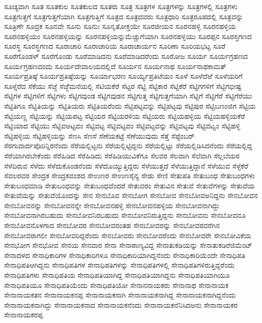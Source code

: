 {ಸೂಚ್ಯವಾಗಿ
ಸೂತ
ಸೂತಕುಲ
ಸೂತಕುಲದ
ಸೂತರು
ಸೂತ್ರ
ಸೂತ್ರಗಳ
ಸೂತ್ರಗಳನ್ನು
ಸೂತ್ರಗಳಲ್ಲಿ
ಸೂತ್ರಗಳು
ಸೂತ್ರಗುತ್ತಗೆ
ಸೂತ್ರಗುತ್ತಗೆಯಾಗಿ
ಸೂತ್ರಗುತ್ತಿಗೆ
ಸೂತ್ರದ
ಸೂತ್ರದವರು
ಸೂತ್ರಧಾರಿ
ಸೂತ್ರರೂಪದಲ್ಲಿ
ಸೂತ್ರವನ್ನು
ಸೂತ್ರಿಣೇ
ಸೂದ್ರಕ
ಸೂನವೇ
ಸೂನು
ಸೂನುಃ
ಸೂನೃತೋಕ್ತಯೇ
ಸೂರಜೀಯನ
ಸೂರನಹಳ್ಳಿ
ಸೂರನಹಳ್ಳಿಯ
ಸೂರನಹಳ್ಳಿಯಂ
ಸೂರನಹಳ್ಳಿಯನ್ನು
ಸೂರನಹಳ್ಳಿಯನ್ನುಮೆಚ್ಚುಗೆಯಾಗಿ
ಸೂರನಹಳ್ಳಿಯು
ಸೂರಪ್ಪನ
ಸೂರಸ್ತಗಣದ
ಸೂರಸ್ಥ
ಸೂರಸ್ಥಗಣದ
ಸೂರಾಚಾರಿ
ಸೂರಾಚಾರಿಯ
ಸೂರಾಚಾರ್ಯನ
ಸೂರಿಣಾ
ಸೂರಿಯಭಟ್ಟ
ಸೂರೆ
ಸೂರೆಗೊಂಡಳ್
ಸೂರೆಗೊಂಡು
ಸೂರೆಮಾಡಿದನು
ಸೂರೆಮಾಡಿದರೆಂದು
ಸೂರೋಜ
ಸೂರ್ಯ
ಸೂರ್ಯಗ್ರಹಣದ
ಸೂರ್ಯಗ್ರಹಣದಂದು
ಸೂರ್ಯದೇವಾಲಯದಲ್ಲಿದೆ
ಸೂರ್ಯನ
ಸೂರ್ಯನಾಥ
ಸೂರ್ಯನಾಥಕಾಮತ್
ಸೂರ್ಯಪ್ರತಿಷ್ಠೆ
ಸೂರ್ಯಪ್ರತಿಷ್ಠೆಯನ್ನು
ಸೂರ್ಯಾಭರಣ
ಸೂರ್ಯ್ಯಪ್ರತಿಟೆಯಂ
ಸೂಳೆ
ಸೂಳೆದೆಱೆ
ಸೂಳೆಯರಿಗೆ
ಸೂಳ್ನೆರೆದ
ಸೆಕೆಯು
ಸೆಜ್ಜೆ
ಸೆಜ್ಜೆೆಮನೆಯಲ್ಲಿ
ಸೆಟಿಯಕೆರೆ
ಸೆಟ್ಟರ
ಸೆಟ್ಟಿ
ಸೆಟ್ಟಿಕಾರ
ಸೆಟ್ಟಿಕೆರೆ
ಸೆಟ್ಟಿಗಗಳಿಗೆ
ಸೆಟ್ಟಿಗಭೀಷ್ಟ
ಸೆಟ್ಟಿಗಳ
ಸೆಟ್ಟಿಗಳಿಗೆ
ಸೆಟ್ಟಿಗಳು
ಸೆಟ್ಟಿಗವುಂಡ
ಸೆಟ್ಟಿಗವುಡನ
ಸೆಟ್ಟಿಗುತ್ತ
ಸೆಟ್ಟಿಗುತ್ತಗೆಯಾಗಿ
ಸೆಟ್ಟಿಗೆ
ಸೆಟ್ಟಿಗೆರೆ
ಸೆಟ್ಟಿಗೆರೆಯು
ಸೆಟ್ಟಿತಿಗೂ
ಸೆಟ್ಟಿತಿಯನ್ನು
ಸೆಟ್ಟಿತಿಯರು
ಸೆಟ್ಟಿತಿಯರೆಂದು
ಸೆಟ್ಟಿಪಟ್ಟವನ್ನು
ಸೆಟ್ಟಿಪಟ್ಟವು
ಸೆಟ್ಟಿಪುರ
ಸೆಟ್ಟಿಬಣಂಜಿಗ
ಸೆಟ್ಟಿಯ
ಸೆಟ್ಟಿಯಣ್ಣ
ಸೆಟ್ಟಿಯನ್ನು
ಸೆಟ್ಟಿಯಪಟ್ಟ
ಸೆಟ್ಟಿಯರ
ಸೆಟ್ಟಿಯರಳಿಯ
ಸೆಟ್ಟಿಯರು
ಸೆಟ್ಟಿಯಹಳ್ಳಿಯ
ಸೆಟ್ಟಿಯಹಳ್ಳಿಯಕೆರೆ
ಸೆಟ್ಟಿಯಾದ
ಸೆಟ್ಟಿಯು
ಸೆಟ್ಟಿವಅಟ್ಟವಂ
ಸೆಟ್ಟಿವಟ್ಟ
ಸೆಟ್ಟಿವಟ್ಟವಂ
ಸೆಟ್ಟಿವಟ್ಟವನ್ನು
ಸೆಟ್ಟಿವಟ್ಟವು
ಸೆಟ್ಟಿವಟ್ವಂ
ಸೆಟ್ಟಿಹಳ್ಳಿ
ಸೆಟ್ಟಿಹಳ್ಳಿಯ
ಸೆಟ್ಟಿಹಳ್ಳಿಯನ್ನು
ಸೆಣಸಿ
ಸೆಣಸೆ
ಸೆಣೆಯಕಟ್ಟೆ
ಸೆಣೆಯುವುದು
ಸೆತ್ತೆ
ಸೆಪ್ಟೆಂಬರ್
ಸೆರಗುವಾರ್ದಪೊರಿನ್ನಿರನೆಂದು
ಸೆರೆಯಲ್ಲಿಟ್ಟನು
ಸೆರೆಯಲ್ಲಿಟ್ಟಿದ್ದನು
ಸೆರೆಯಲ್ಲಿಟ್ಟು
ಸೆರೆಯಲ್ಲಿಡಿಸಿದನೆಂದು
ಸೆರೆಯಲ್ಲಿದ್ದ
ಸೆರೆಯಾಗಿರಬೇಕೆಂದು
ಸೆರೆಹಿಡಿದ
ಸೆರೆಹಿಡಿದು
ಸೆರೆಹಿಡಿಯುವಿಕೆಗೂ
ಸೆಲವರ
ಸೆಲವಾಗಿ
ಸೆಲೆವಾಗಿ
ಸೆಲ್ಲಬೆಯರ
ಸೆಳೆದಿರುವ
ಸೆಳೆದು
ಸೆಳೆದುಕೊಂಡನೆಂದು
ಸೆಳೆದೊಯ್ಯುತ್ತಿದ್ದರು
ಸೆಳೆಯುತ್ತದೆ
ಸೆಳೆಯುತ್ತಿದ್ದಾನೆ
ಸೆಳೆಯುವ
ಸೆಳ್ಳೆಕೆರೆ
ಸೆವಲರವರ
ಸೇಂದ್ರಕ
ಸೇಂದ್ರಕವಂಶದ
ಸೇಉಣರ
ಸೇಉಣಸೈನ್ಯ
ಸೇಡು
ಸೇಣಿ
ಸೇತುಪತಿ
ಸೇತುಬಂಧ
ಸೇತುಬಂಧಗಳು
ಸೇತುಬಂಧಮಾಡಿ
ಸೇತುಬಂಧವನ್ನು
ಸೇತುಬಂಧವೆಂದರೆ
ಸೇತುವರಂ
ಸೇತುವಿನ
ಸೇತುವೆ
ಸೇತುವೆಗಳನ್ನು
ಸೇತುವೆಯ
ಸೇತುವೆಯನ್ನು
ಸೇತುವೆಯೊಂದನ್ನು
ಸೇನ
ಸೇನಬೊವ
ಸೇನಬೋಗ
ಸೇನಬೋವ
ಸೇನಬೋವಅನಿದ್ದನು
ಸೇನಬೋವನ
ಸೇನಬೋವನನ್ನು
ಸೇನಬೋವನನ್ನೇ
ಸೇನಬೋವನಹಳ್ಳಿ
ಸೇನಬೋವನಹಳ್ಳಿಯ
ಸೇನಬೋವನಾಗಿದ್ದು
ಸೇನಬೋವನಾಗಿರಬಹುದು
ಸೇನಬೋವನಿರಬಹುದು
ಸೇನಬೋವನಿರುತ್ತಿದ್ದನು
ಸೇನಬೋವನು
ಸೇನಬೋವನೂ
ಸೇನಬೋವನೊಳಗಾದ
ಸೇನಬೋವರ
ಸೇನಬೋವರಂತಹ
ಸೇನಬೋವರನ್ನು
ಸೇನಬೋವರವರೆಗಿನ
ಸೇನಬೋವರಾಗಲೀ
ಸೇನಬೋವರಿದ್ದರೆಂದು
ಸೇನಬೋವರು
ಸೇನಬೋವರೆಂದು
ಸೇನಬೋವರೇ
ಸೇನಬೋವಿಕೆಯ
ಸೇನಭೋಗ
ಸೇನಭೋವ
ಸೇನಯ
ಸೇನವಾರ
ಸೇನಾ
ಸೇನಾಠಾಣ್ಯವಿದ್ದ
ಸೇನಾತುಕಡಿಯನ್ನು
ಸೇನಾತುಕಡಿರೆಜಿಮೆಂಟ್
ಸೇನಾದಳದ
ಸೇನಾಧಿಕಾರಿಗಳ
ಸೇನಾಧಿಕಾರಿಗಳೂ
ಸೇನಾಧಿಕಾರಿಯಾಗಿದ್ದನೆಂದು
ಸೇನಾಧಿಕಾರಿಯೆಂದೇ
ಸೇನಾಧಿಪತಿ
ಸೇನಾಧಿಪತಿಆಗಿದ್ದನು
ಸೇನಾಧಿಪತಿಗಳ
ಸೇನಾಧಿಪತಿಗಳನ್ನು
ಸೇನಾಧಿಪತಿಗಳಲ್ಲಿ
ಸೇನಾಧಿಪತಿಗಳಿರುತ್ತಿದ್ದರೆಂದು
ಸೇನಾಧಿಪತಿಗಳು
ಸೇನಾಧಿಪತಿಯ
ಸೇನಾಧಿಪತಿಯಾಗಿದ್ದ
ಸೇನಾಧಿಪತಿಯಾಗಿದ್ದನು
ಸೇನಾಧಿಪತಿಯಾಗಿಯೂ
ಸೇನಾಧಿಪತಿಯೂ
ಸೇನಾಧಿಪತಿಯೆಂದು
ಸೇನಾಧಿಪತಿಯೋ
ಸೇನಾನನಾಯಕರು
ಸೇನಾನಾಥ
ಸೇನಾನಾಯಕ
ಸೇನಾನಾಯಕತನ
ಸೇನಾನಾಯಕನಪ್ಪ
ಸೇನಾನಾಯಕನಾಗಿ
ಸೇನಾನಾಯಕನಾಗಿದ್ದ
ಸೇನಾನಾಯಕನಾಗಿದ್ದನೆಂದು
ಸೇನಾನಾಯಕನಾಗಿದ್ದು
ಸೇನಾನಾಯಕನಾದ
ಸೇನಾನಾಯಕನೆಂದು
ಸೇನಾನಾಯಕನೆನಿಸಿದಅನು
ಸೇನಾನಾಯಕರ
ಸೇನಾನಾಯಕರಪ್ಪ
}
